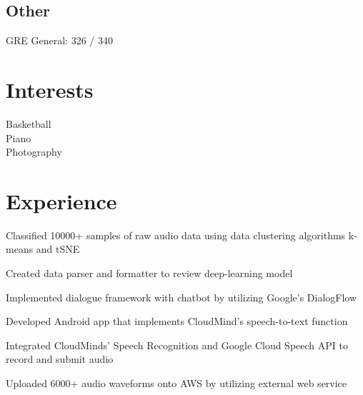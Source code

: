 \documentclass[]{deedy-resume-openfont}
\begin{document}
\begin{minipage}[t]{0.33\textwidth}
\subsection{Other}
GRE General: 326 / 340 
\sectionsep

\section{Interests}
Basketball \\ Piano \\ Photography 
\sectionsep

%
%

\end{minipage} 
\hfill
\begin{minipage}[t]{0.66\textwidth} 


\section{Experience}

\sectionsep
\begin{tightemize} 
\item Classified 10000+ samples of raw audio data using data clustering algorithms k-means and tSNE
\item Created data parser and formatter to review deep-learning model
\item Implemented dialogue framework with chatbot by utilizing Google's DialogFlow
\end{tightemize}
\sectionsep

\begin{tightemize} 
\item Developed Android app that implements CloudMind's speech-to-text function
\item Integrated CloudMinds’ Speech Recognition and Google Cloud Speech API to record and submit audio
\item Uploaded 6000+ audio waveforms onto AWS by utilizing external web service 
\end{tightemize}
\sectionsep


\end{minipage}
\end{document}
